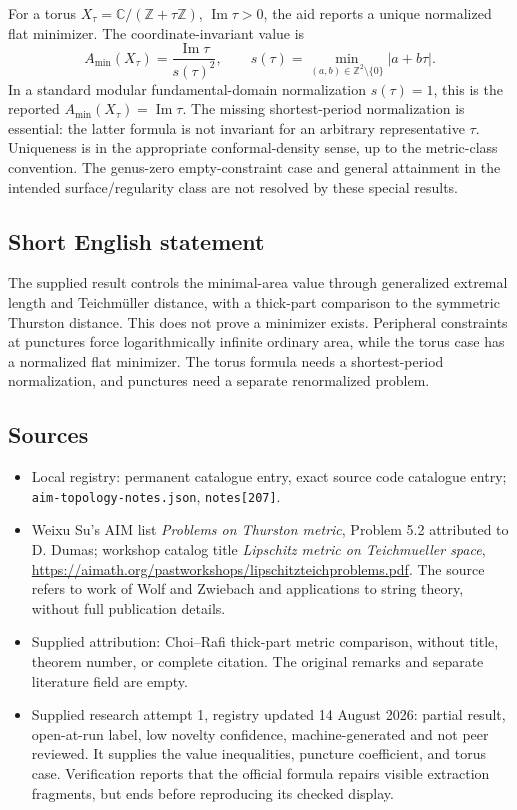 \documentclass[11pt]{article}
\newcommand{\Z}{\mathbb{Z}}
\newcommand{\C}{\mathbb{C}}
\begin{document}
For a torus $X_\tau=\C/(\Z+\tau\Z)$, $\operatorname{Im}\tau>0$, the aid reports a unique normalized flat minimizer. The coordinate-invariant value is
\[
A_{\min}(X_\tau)=\frac{\operatorname{Im}\tau}{s(\tau)^2},\qquad
s(\tau)=\min_{(a,b)\in\Z^2\setminus\{0\}}|a+b\tau|.
\]
In a standard modular fundamental-domain normalization $s(\tau)=1$, this is the reported $A_{\min}(X_\tau)=\operatorname{Im}\tau$. The missing shortest-period normalization is essential: the latter formula is not invariant for an arbitrary representative $\tau$. Uniqueness is in the appropriate conformal-density sense, up to the metric-class convention. The genus-zero empty-constraint case and general attainment in the intended surface/regularity class are not resolved by these special results.
\subsection{Short English statement}
The supplied result controls the minimal-area value through generalized extremal length and Teichm\"uller distance, with a thick-part comparison to the symmetric Thurston distance. This does not prove a minimizer exists. Peripheral constraints at punctures force logarithmically infinite ordinary area, while the torus case has a normalized flat minimizer. The torus formula needs a shortest-period normalization, and punctures need a separate renormalized problem.
\subsection{Sources}
\begin{itemize}
\item Local registry: permanent catalogue entry, exact source code catalogue entry; \texttt{aim-topology-notes.json}, \texttt{notes[207]}.
\item Weixu Su's AIM list \emph{Problems on Thurston metric}, Problem 5.2 attributed to D. Dumas; workshop catalog title \emph{Lipschitz metric on Teichmueller space}, \url{https://aimath.org/pastworkshops/lipschitzteichproblems.pdf}. The source refers to work of Wolf and Zwiebach and applications to string theory, without full publication details.
\item Supplied attribution: Choi--Rafi thick-part metric comparison, without title, theorem number, or complete citation. The original remarks and separate literature field are empty.
\item Supplied research attempt 1, registry updated 14 August 2026: partial result, open-at-run label, low novelty confidence, machine-generated and not peer reviewed. It supplies the value inequalities, puncture coefficient, and torus case. Verification reports that the official formula repairs visible extraction fragments, but ends before reproducing its checked display.
\end{itemize}
\end{document}
